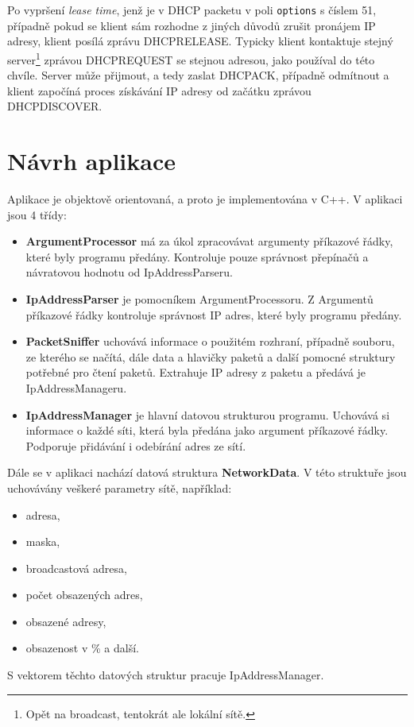 \documentclass[a4paper, 11pt, hidelinks]{article}
\begin{document}
Po vypršení \emph{lease time}, jenž je v DHCP packetu v poli \texttt{options} s číslem 51, případně pokud se klient sám rozhodne z jiných důvodů zrušit pronájem IP adresy, klient posílá zprávu DHCPRELEASE.
Typicky klient kontaktuje stejný server\footnote[5]{Opět na broadcast, tentokrát ale lokální sítě.} zprávou DHCPREQUEST se stejnou adresou, jako používal do této chvíle.
Server může přijmout, a tedy zaslat DHCPACK, případně odmítnout a klient započíná proces získávání IP adresy od začátku zprávou DHCPDISCOVER.
\section{Návrh aplikace}\label{2_navrh}
Aplikace je objektově orientovaná, a proto je implementována v C++.
V aplikaci jsou 4 třídy:
\begin{itemize}
    \item \textbf{ArgumentProcessor} má za úkol zpracovávat argumenty příkazové řádky, které byly programu předány. Kontroluje pouze správnost přepínačů a návratovou hodnotu od IpAddressParseru.
    \item \textbf{IpAddressParser} je pomocníkem ArgumentProcessoru. Z Argumentů příkazové řádky kontroluje správnost IP adres, které byly programu předány. 
    \item \textbf{PacketSniffer} uchovává informace o použitém rozhraní, případně souboru, ze kterého se načítá, dále data a hlavičky paketů a další pomocné struktury potřebné pro čtení paketů.
    Extrahuje IP adresy z paketu a předává je IpAddressManageru.
    \item \textbf{IpAddressManager} je hlavní datovou strukturou programu.
    Uchovává si informace o každé síti, která byla předána jako argument příkazové řádky. 
    Podporuje přidávání i odebírání adres ze sítí.
\end{itemize}\newpage
Dále se v aplikaci nachází datová struktura \textbf{NetworkData}. 
V této struktuře jsou uchovávány veškeré parametry sítě, například:
\begin{itemize}
    \item adresa,
    \item maska,
    \item broadcastová adresa,
    \item počet obsazených adres,
    \item obsazené adresy,
    \item obsazenost v \% a další.
\end{itemize}
S vektorem těchto datových struktur pracuje IpAddressManager.
\end{document}
